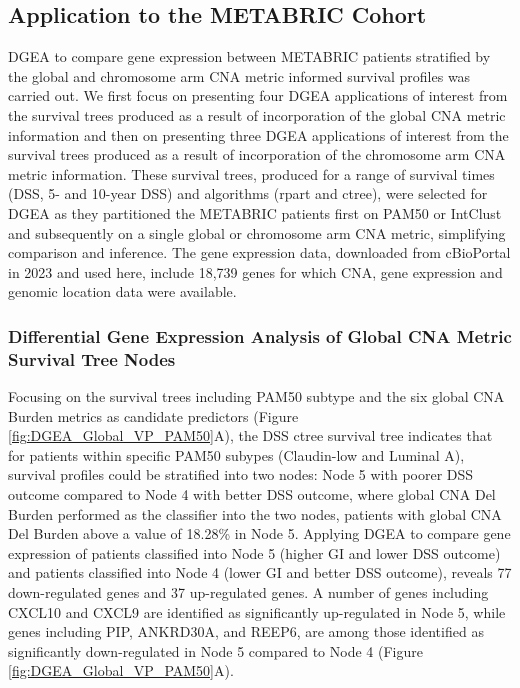 \subsection{Application to the METABRIC Cohort}
DGEA to compare gene expression between METABRIC patients stratified by the global and chromosome arm CNA metric informed survival profiles was carried out. We first focus on presenting four DGEA applications of interest from the survival trees produced as a result of incorporation of the global CNA metric information and then on presenting three DGEA applications of interest from the survival trees produced as a result of incorporation of the chromosome arm CNA metric information. These survival trees, produced for a range of survival times (DSS, 5- and 10-year DSS) and algorithms (rpart and ctree), were selected for DGEA as they partitioned the METABRIC patients first on PAM50 or IntClust and subsequently on a single global or chromosome arm CNA metric, simplifying comparison and inference. The gene expression data, downloaded from cBioPortal in 2023 and used here, include 18,739 genes for which CNA, gene expression and genomic location data were available. 

\subsubsection{Differential Gene Expression Analysis of Global CNA Metric Survival Tree Nodes}
\label{Sec_limma}
Focusing on the survival trees including PAM50 subtype and the six global CNA Burden metrics as candidate predictors (Figure \ref{fig:DGEA_Global_VP_PAM50}A), the DSS ctree survival tree indicates that for patients within specific PAM50 subypes (Claudin-low and Luminal A), survival profiles could be stratified into two nodes: Node 5 with poorer DSS outcome compared to Node 4 with better DSS outcome, where global CNA Del Burden performed as the classifier into the two nodes, patients with global CNA Del Burden above a value of 18.28\% in Node 5. Applying DGEA to compare gene expression of patients classified into Node 5 (higher GI and lower DSS outcome) and patients classified into Node 4 (lower GI and better DSS outcome), reveals 77 down-regulated genes and 37 up-regulated genes. A number of genes including CXCL10 and CXCL9 are identified as significantly up-regulated in Node 5, while genes including PIP, ANKRD30A, and REEP6, are among those identified as significantly down-regulated in Node 5 compared to Node 4 (Figure \ref{fig:DGEA_Global_VP_PAM50}A).  

